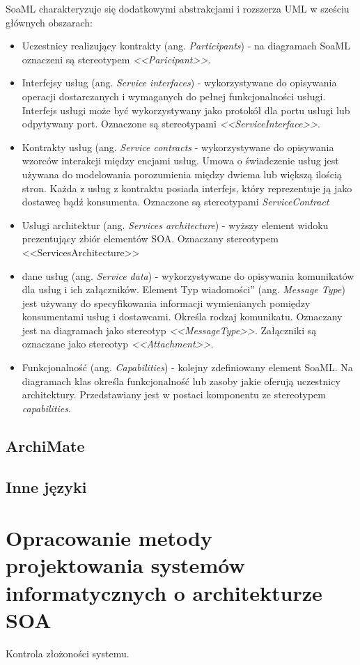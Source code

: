 SoaML charakteryzuje się dodatkowymi abstrakcjami\cite{PlatIntGor} i rozszerza UML w sześciu głównych obszarach: 
\begin{itemize}
\item{Uczestnicy realizujący kontrakty (ang. \emph{Participants}) - na diagramach SoaML oznaczeni są stereotypem \emph{<<Paricipant>>}.}
\item{Interfejsy usług (ang. \emph{Service interfaces}) - wykorzystywane do opisywania operacji dostarczanych i wymaganych do pełnej funkcjonalności usługi. Interfejs usługi może być wykorzystywany jako protokół dla portu usługi lub odpytywany port. Oznaczone są stereotypami \emph{<<ServiceInterface>>}.}
\item{Kontrakty usług (ang. \emph{Service contracts} - wykorzystywane do opisywania wzorców interakcji między encjami usług. Umowa o świadczenie usług jest używana do modelowania porozumienia między dwiema lub większą ilością stron. Każda z usług z kontraktu posiada interfejs, który reprezentuje ją jako dostawcę bądź konsumenta. Oznaczone są stereotypami \emph{ServiceContract}}
\item{Usługi architektur (ang. \emph{Services architecture}) - wyższy element widoku prezentujący zbiór elementów SOA. Oznaczany stereotypem <<ServicesArchitecture>>}
\item{dane usług (ang. \emph{Service data}) - wykorzystywane do opisywania komunikatów dla usług i ich załączników. Element \quotedblbase Typ wiadomości\textquotedblright} (ang. \emph{Message Type}) jest używany do specyfikowania informacji wymienianych pomiędzy konsumentami usług i dostawcami. Określa rodzaj komunikatu. Oznaczany jest na diagramach jako stereotyp \emph{<<MessageType>>}. Załączniki są oznaczane jako stereotyp \emph{<<Attachment>>.}
\item{Funkcjonalność (ang. \emph{Capabilities}) - kolejny zdefiniowany element SoaML. Na diagramach klas określa funkcjonalność lub zasoby jakie oferują uczestnicy architektury. Przedstawiany jest w postaci komponentu ze stereotypem \emph{capabilities}.\cite{SoaMLErvBase}}
\end{itemize} 
\section{ArchiMate}
\section{Inne języki}

\chapter{Opracowanie metody projektowania systemów informatycznych o architekturze SOA}
Kontrola złożoności systemu.


